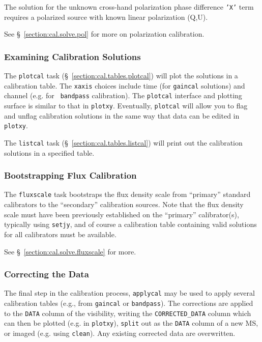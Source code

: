 The solution for the unknown cross-hand polarization phase difference
{\tt 'X'} term requires a polarized source with known linear
polarization (Q,U).

See \S~\ref{section:cal.solve.pol} for more on polarization calibration.

\subsubsection{Examining Calibration Solutions}
\label{section:intro.walkthru.calib.plotcal}

The {\tt plotcal} task (\S~\ref{section:cal.tables.plotcal}) will plot the
solutions in a calibration table.  The {\tt xaxis} choices include
time (for {\tt gaincal} solutions) and channel (e.g. for {\tt
bandpass} calibration).  
The {\tt plotcal} interface and plotting surface is similar to that in
{\tt plotxy}.  Eventually, {\tt plotcal} will allow you to flag and
unflag calibration solutions in the same way that data can be edited
in {\tt plotxy}.

The {\tt listcal} task (\S~\ref{section:cal.tables.listcal}) will print out
the calibration solutions in a specified table.

\subsubsection{Bootstrapping Flux Calibration}
\label{section:intro.walkthru.calib.fluxscale}

The {\tt fluxscale} task bootstraps the flux density scale from
``primary'' standard calibrators to the ``secondary'' calibration
sources.  Note that the flux density scale must have been previously
established on the ``primary'' calibrator(s), typically using 
{\tt setjy}, and of course a calibration table containing
valid solutions for all calibrators must be available.

See \S~\ref{section:cal.solve.fluxscale} for more.

\subsubsection{Correcting the Data}
\label{section:intro.walkthru.calib.applycal}

The final step in the calibration process, {\tt applycal} may be used
to apply several calibration tables (e.g., from {\tt gaincal} or
{\tt bandpass}). 
The corrections are applied to the {\tt DATA} column of the
visibility, writing the {\tt CORRECTED\_DATA} column which can then be
plotted (e.g. in {\tt plotxy}), {\tt split} out as the {\tt DATA}
column of a new MS, or imaged (e.g. using {\tt clean}).  Any existing
corrected data are overwritten.

